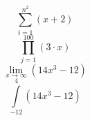 \begin{equation*}
  \sum_{i=1}^{n^2}(x+2)
\end{equation*}
\begin{equation*}
  \prod_{j=1}^{100}(3 \cdot x)
\end{equation*}
\begin{equation*}
  \lim_{x \rightarrow \infty}(14x^3 - 12)
\end{equation*}
\begin{equation*}
  \int\limits_{-12}^{4}(14x^3 - 12)
\end{equation*}